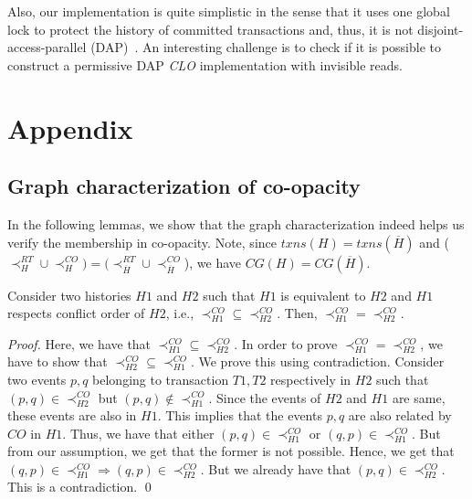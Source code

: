 \documentclass{llncs}
\newcommand{\clo} {\textit{CLO}}
\newcommand{\txns}{\textit{txns}}
\newcommand{\cg}[1] {CG(#1)}
\newcommand{\coopty} {co-opacity}
\begin{document}
Also, our implementation is quite simplistic in the sense that 
it uses one global lock to protect the history of
committed transactions and, thus, it is not
disjoint-access-parallel (DAP)~\cite{israeli-disjoint,AHM09}.
An interesting challenge is to check if it is possible to construct a permissive
DAP \clo{} implementation with invisible reads. 





     
 





\appendix




\section{Appendix}

\subsection{Graph characterization of \coopty}
\label{subsec:ap-graph}

In the following lemmas, we show that the graph characterization indeed helps us verify the membership in \coopty. Note, since $\txns(H)=\txns(\overline{H})$ and ($\prec_H^{RT}\cup\prec_H^{CO})=(\prec_{\overline{H}}^{RT}\cup\prec_{\overline{H}}^{CO}$), we have $\cg{H} = \cg{\overline{H}}$. 

\begin{lemma}
\label{lem:ap-co-eq}
Consider two histories $H1$ and $H2$ such that $H1$ is equivalent to
$H2$ and $H1$ respects conflict order of $H2$, i.e., $\prec_{H1}^{CO} \subseteq \prec_{H2}^{CO}$. Then, $\prec_{H1}^{CO} = \prec_{H2}^{CO}$. 
\end{lemma}

\begin{proof}
Here, we have that $\prec_{H1}^{CO} \subseteq \prec_{H2}^{CO}$. In order to prove $\prec_{H1}^{CO} = \prec_{H2}^{CO}$, we have to show that $\prec_{H2}^{CO} \subseteq \prec_{H1}^{CO}$. We prove this using contradiction. Consider two events $p,q$ belonging to transaction $T1,T2$ respectively in $H2$ such that $(p,q) \in \prec_{H2}^{CO}$ but $(p,q) \notin \prec_{H1}^{CO}$. Since the events of $H2$ and $H1$ are same, these events are also in $H1$. This implies that the events $p, q$ are also related by $CO$ in $H1$. Thus, we have that either $(p,q) \in \prec_{H1}^{CO}$  or $(q,p) \in \prec_{H1}^{CO}$. But from our assumption, we get that the former is not possible. Hence, we get that $(q,p) \in \prec_{H1}^{CO} \Rightarrow (q,p) \in \prec_{H2}^{CO}$. But we already have that $(p,q) \in \prec_{H2}^{CO}$. This is a contradiction. \qed
\end{proof}
\end{document}
